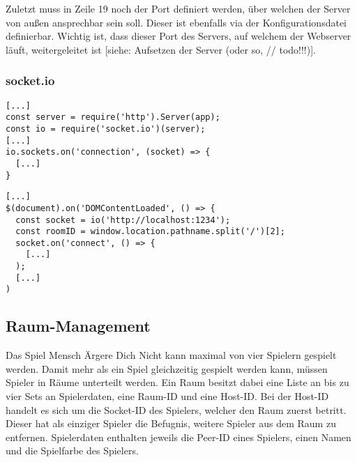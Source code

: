 Zuletzt muss in Zeile 19 noch der Port definiert werden, über welchen der Server von außen ansprechbar sein soll. Dieser ist ebenfalls via der Konfigurationsdatei definierbar. Wichtig ist, dass dieser Port des Servers, auf welchem der Webserver läuft, weitergeleitet ist [siehe: Aufsetzen der Server (oder so, // todo!!!)].

\subsubsection{socket.io}

\vspace{11pt}
\lstset{language=js, style=STYLE_CODE_JS}
\begin{minipage}{\textwidth}
\begin{singlespace}
\begin{lstlisting}[caption={Initialisierung des socket.io Servers -- Server.js}, captionpos=b, label={lst:socketioserver}]
[...]
const server = require('http').Server(app);
const io = require('socket.io')(server);
[...]
io.sockets.on('connection', (socket) => {
  [...]
}
\end{lstlisting}
\end{singlespace}
\end{minipage}


\vspace{11pt}
\lstset{language=js, style=STYLE_CODE_JS}
\begin{minipage}{\textwidth}
\begin{singlespace}
\begin{lstlisting}[caption={Clientseitiger Verbindungsaufbau -- game.js}, captionpos=b, label={lst:socketioclient}]
[...]
$(document).on('DOMContentLoaded', () => {
  const socket = io('http://localhost:1234');
  const roomID = window.location.pathname.split('/')[2];
  socket.on('connect', () => {
    [...]
  );
  [...]
)
\end{lstlisting}
\end{singlespace}
\end{minipage}


\subsection{Raum-Management}
Das Spiel \glqq{}Mensch Ärgere Dich Nicht\grqq{} kann maximal von vier Spielern gespielt werden. Damit mehr als ein Spiel gleichzeitig gespielt werden kann, müssen Spieler in \glqq{}Räume\grqq{} unterteilt werden. Ein Raum besitzt dabei eine Liste an bis zu vier Sets an Spielerdaten, eine Raum-ID und eine Host-ID. Bei der Host-ID handelt es sich um die Socket-ID des Spielers, welcher den Raum zuerst betritt. Dieser hat als einziger Spieler die Befugnis, weitere Spieler aus dem Raum zu entfernen. Spielerdaten enthalten jeweils die Peer-ID eines Spielers, einen Namen und die Spielfarbe des Spielers.

